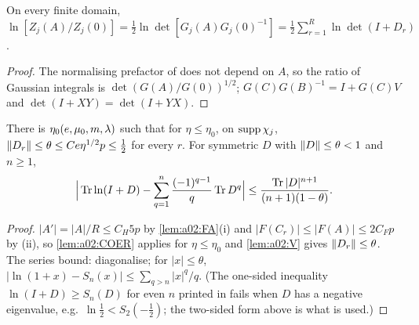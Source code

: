 \begin{lemma}\label{lem:a02:DI}
On every finite domain, $\ln[Z_j(A)/Z_j(0)]=\frac12\ln\det[G_j(A)G_j(0)^{-1}]=\frac12\sum_{r=1}^R\ln\det(I+D_r)$.
\end{lemma}
\begin{proof}
The normalising prefactor of \cite[(2.15)]{K1} does not depend on $A$, so the ratio of Gaussian integrals is $\det(G(A)/G(0))^{1/2}$; $G(C)G(B)^{-1}=I+G(C)V$ and $\det(I+XY)=\det(I+YX)$.
\end{proof}

\begin{lemma}\label{lem:a02:D}
There is $\eta_0(e,\mu_0,m,\lambda)$ such that for $\eta\le\eta_0$, on $\operatorname{supp}\chi_j$, $\lVert D_r\rVert\le\theta\le Ce\eta^{1/2}p\le\frac12$ for every $r$. For symmetric $D$ with $\lVert D\rVert\le\theta<1$ and $n\ge1$,
\[
\Big|\operatorname{Tr}\ln(I+D)-\sum_{q=1}^n\frac{(-1)^{q-1}}q\operatorname{Tr} D^q\Big|\le\frac{\operatorname{Tr}|D|^{n+1}}{(n+1)(1-\theta)}.
\]
\end{lemma}
\begin{proof}
$|A'|=|A|/R\le C_H5p$ by \cref{lem:a02:FA}(i) and $|F(C_r)|\le|F(A)|\le2C_Fp$ by (ii), so \cref{lem:a02:COER} applies for $\eta\le\eta_0$ and \cref{lem:a02:V} gives $\lVert D_r\rVert\le\theta$. The series bound: diagonalise; for $|x|\le\theta$, $|\ln(1+x)-S_n(x)|\le\sum_{q>n}|x|^q/q$. (The one-sided inequality $\ln(I+D)\ge S_n(D)$ for even $n$ printed in \cite[(3.96)]{K1} fails when $D$ has a negative eigenvalue, e.g.\ $\ln\frac12<S_2(-\frac12)$; the two-sided form above is what is used.)
\end{proof}

